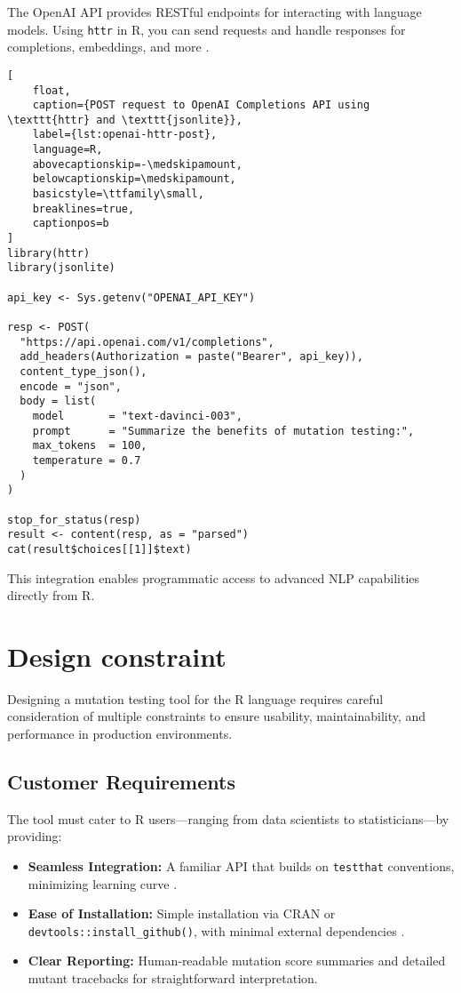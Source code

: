 The OpenAI API provides RESTful endpoints for interacting with language models. Using \texttt{httr} in R, you can send requests and handle responses for completions, embeddings, and more \cite{openai2023api}.

\begin{lstlisting}[
    float,
    caption={POST request to OpenAI Completions API using \texttt{httr} and \texttt{jsonlite}},
    label={lst:openai-httr-post},
    language=R,
    abovecaptionskip=-\medskipamount,
    belowcaptionskip=\medskipamount,
    basicstyle=\ttfamily\small,
    breaklines=true,
    captionpos=b
]
library(httr)
library(jsonlite)

api_key <- Sys.getenv("OPENAI_API_KEY")

resp <- POST(
  "https://api.openai.com/v1/completions",
  add_headers(Authorization = paste("Bearer", api_key)),
  content_type_json(),
  encode = "json",
  body = list(
    model       = "text-davinci-003",
    prompt      = "Summarize the benefits of mutation testing:",
    max_tokens  = 100,
    temperature = 0.7
  )
)

stop_for_status(resp)
result <- content(resp, as = "parsed")
cat(result$choices[[1]]$text)
\end{lstlisting}


This integration enables programmatic access to advanced NLP capabilities directly from R.

\section{Design constraint}

Designing a mutation testing tool for the R language requires careful consideration of multiple constraints to ensure usability, maintainability, and performance in production environments.

\subsection{Customer Requirements}
The tool must cater to R users—ranging from data scientists to statisticians—by providing:
\begin{itemize}
  \item \textbf{Seamless Integration:} A familiar API that builds on \texttt{testthat} conventions, minimizing learning curve \cite{wickham2011testthat}.
  \item \textbf{Ease of Installation:} Simple installation via CRAN or \texttt{devtools::install\_github()}, with minimal external dependencies \cite{wickham2019devtools}.
  \item \textbf{Clear Reporting:} Human‐readable mutation score summaries and detailed mutant tracebacks for straightforward interpretation.
\end{itemize}

